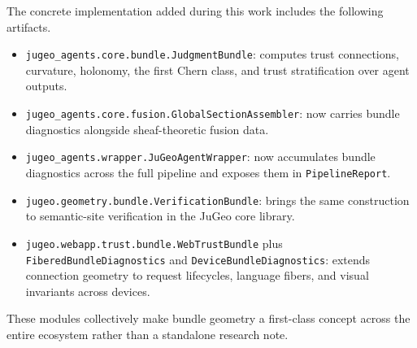 \documentclass[11pt]{article}
\begin{document}
The concrete implementation added during this work includes the following
artifacts.
\begin{itemize}
  \item \texttt{jugeo\_agents.core.bundle.JudgmentBundle}: computes trust
    connections, curvature, holonomy, the first Chern class, and trust
    stratification over agent outputs.
  \item \texttt{jugeo\_agents.core.fusion.GlobalSectionAssembler}: now carries
    bundle diagnostics alongside sheaf-theoretic fusion data.
  \item \texttt{jugeo\_agents.wrapper.JuGeoAgentWrapper}: now accumulates
    bundle diagnostics across the full pipeline and exposes them in
    \texttt{PipelineReport}.
  \item \texttt{jugeo.geometry.bundle.VerificationBundle}: brings the same
    construction to semantic-site verification in the JuGeo core library.
  \item \texttt{jugeo.webapp.trust.bundle.WebTrustBundle} plus
    \texttt{FiberedBundleDiagnostics} and \texttt{DeviceBundleDiagnostics}:
    extends connection geometry to request lifecycles, language fibers, and
    visual invariants across devices.
\end{itemize}

These modules collectively make bundle geometry a first-class concept across the
entire ecosystem rather than a standalone research note.
\end{document}
